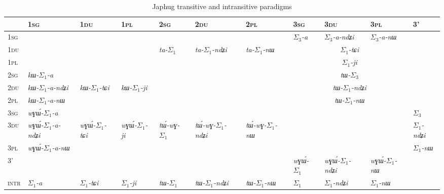 \documentclass[oneside,a4paper,11pt]{article}
\newcommand{\ipa}[1]{\textit{\phon\mbox{#1}}} %
\newcommand{\grise}[1]{\cellcolor{lightgray}\textbf{#1}}
\newcommand{\ra}{$\Sigma_1$}
\newcommand{\rc}{$\Sigma_3$}
\begin{document}
\begin{landscape}
\begin{table}[H]
\caption{Japhug transitive and intransitive paradigms}\label{tab:japhug.tr}
\begin{tabular}{l|l|l|l|l|l|l|l|l|l|l|}
\textsc{} & 	\textsc{1sg} & 	  \textsc{1du} & 	\textsc{1pl} & 	\textsc{2sg} & 	\textsc{2du} & 	\textsc{2pl} & 	\textsc{3sg} & 	\textsc{3du} & 	\textsc{3pl} & 	\textsc{3'} \\ 	
\hline
\textsc{1sg} & \multicolumn{3}{c|}{\grise{}} &	\ipa{} & 	\ipa{} & 	\ipa{} & 	\ipa{\rc{}-a}   & 	 \ipa{\rc{}-a-ndʑi} & 	 \ipa{\rc{}-a-nɯ} & 	\grise{} \\	
\cline{8-10}
\textsc{1du} & 	\multicolumn{3}{c|}{\grise{}} &	\ipa{ta-\ra{}} & 	\ipa{ta-\ra{}-ndʑi} & 	\ipa{ta-\ra{}-nɯ} & 	\multicolumn{3}{c|}{ \ipa{\ra{}-tɕi}}  & 	\grise{} \\	
\cline{8-10}
\textsc{1pl} & 	\multicolumn{3}{c|}{\grise{}} & 	  & 	&  & 	\multicolumn{3}{c|}{ \ipa{\ra{}-ji}}  & 	\grise{} \\	
\cline{1-10}
\textsc{2sg} & 	\ipa{kɯ-\ra{}-a} & 	\ipa{} & 	\ipa{} & 	\multicolumn{3}{c|}{\grise{}}&	\multicolumn{3}{c|}{\ipa{tɯ-\rc{}}} & 	\grise{} \\	
\cline{2-2}
\cline{8-10}
\textsc{2du} & 	\ipa{kɯ-\ra{}-a-ndʑi} & 	\ipa{kɯ-\ra{}-tɕi} & 	\ipa{kɯ-\ra{}-ji} & 	\multicolumn{3}{c|}{\grise{}} &	\multicolumn{3}{c|}{\ipa{tɯ-\ra{}-ndʑi}} & 	\grise{} \\	
\cline{2-2}
\cline{8-10}
\textsc{2pl} & 	\ipa{kɯ-\ra{}-a-nɯ} & 	\ipa{} & 	\ipa{} & 	\multicolumn{3}{c|}{\grise{}}&	\multicolumn{3}{c|}{\ipa{tɯ-\ra{}-nɯ}} & 	\grise{} \\	
\hline
\textsc{3sg} &  	\ipa{wɣɯ́-\ra{}-a} & 	\ipa{} & 	\ipa{} & 	\ipa{} & 	\ipa{} & 	\ipa{} & \multicolumn{3}{c|}{\grise{}} &	\ipa{\rc{}} \\ 	
\cline{2-2}
\cline{11-11}
\textsc{3du} &  	\ipa{wɣɯ́-\ra{}-a-ndʑi} & 	 \ipa{wɣɯ́-\ra{}-tɕi} & 		\ipa{wɣɯ́-\ra{}-ji} & 	\ipa{tɯ́-wɣ-\ra{}} & 	\ipa{tɯ́-wɣ-\ra{}-ndʑi} & 	\ipa{tɯ́-wɣ-\ra{}-nɯ} & 	\multicolumn{3}{c|}{\grise{}} &	\ipa{\ra{}-ndʑi} \\ 
\cline{2-2}	
\cline{11-11}
\textsc{3pl} &  	\ipa{wɣɯ́-\ra{}-a-nɯ} & 	\ipa{} & 	\ipa{} & 	\ipa{} & 	\ipa{} & 	\ipa{} & \multicolumn{3}{c|}{\grise{}} &	\ipa{\ra{}-nɯ} \\ 	
\hline
\textsc{3'} & 	\multicolumn{6}{c|}{\grise{}} &	\ipa{wɣɯ́-\ra{}} & 	\ipa{wɣɯ́-\ra{}-ndʑi} & 	\ipa{wɣɯ́-\ra{}-nɯ} & 	\grise{} \\	
	\hline	\hline
\textsc{intr}&\ipa{\ra{}-a}&\ipa{\ra{}-tɕi}&\ipa{\ra{}-ji}&\ipa{tɯ-\ra{}}&\ipa{tɯ-\ra{}-ndʑi}&\ipa{tɯ-\ra{}-nɯ}&\ipa{\ra{}}&\ipa{\ra{}-ndʑi} &\ipa{\ra{}-nɯ}& 	\grise{} \\	
	\hline
\end{tabular}
\end{table}
\end{landscape}
\end{document}
